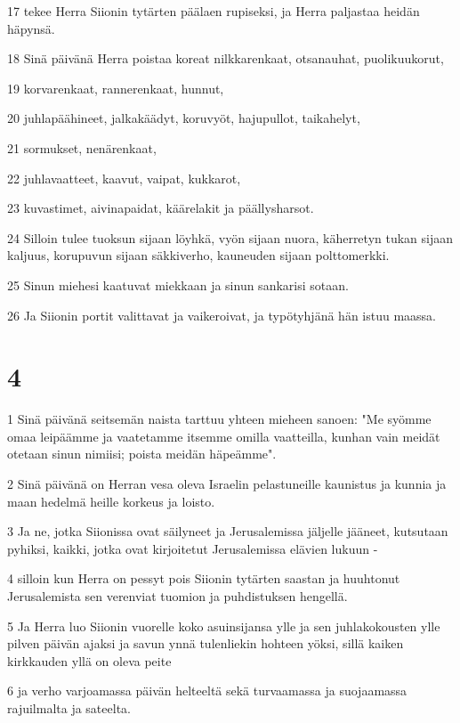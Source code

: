 \par 17 tekee Herra Siionin tytärten päälaen rupiseksi, ja Herra paljastaa heidän häpynsä.
\par 18 Sinä päivänä Herra poistaa koreat nilkkarenkaat, otsanauhat, puolikuukorut,
\par 19 korvarenkaat, rannerenkaat, hunnut,
\par 20 juhlapäähineet, jalkakäädyt, koruvyöt, hajupullot, taikahelyt,
\par 21 sormukset, nenärenkaat,
\par 22 juhlavaatteet, kaavut, vaipat, kukkarot,
\par 23 kuvastimet, aivinapaidat, käärelakit ja päällysharsot.
\par 24 Silloin tulee tuoksun sijaan löyhkä, vyön sijaan nuora, käherretyn tukan sijaan kaljuus, korupuvun sijaan säkkiverho, kauneuden sijaan polttomerkki.
\par 25 Sinun miehesi kaatuvat miekkaan ja sinun sankarisi sotaan.
\par 26 Ja Siionin portit valittavat ja vaikeroivat, ja typötyhjänä hän istuu maassa.

\chapter{4}

\par 1 Sinä päivänä seitsemän naista tarttuu yhteen mieheen sanoen: "Me syömme omaa leipäämme ja vaatetamme itsemme omilla vaatteilla, kunhan vain meidät otetaan sinun nimiisi; poista meidän häpeämme".
\par 2 Sinä päivänä on Herran vesa oleva Israelin pelastuneille kaunistus ja kunnia ja maan hedelmä heille korkeus ja loisto.
\par 3 Ja ne, jotka Siionissa ovat säilyneet ja Jerusalemissa jäljelle jääneet, kutsutaan pyhiksi, kaikki, jotka ovat kirjoitetut Jerusalemissa elävien lukuun -
\par 4 silloin kun Herra on pessyt pois Siionin tytärten saastan ja huuhtonut Jerusalemista sen verenviat tuomion ja puhdistuksen hengellä.
\par 5 Ja Herra luo Siionin vuorelle koko asuinsijansa ylle ja sen juhlakokousten ylle pilven päivän ajaksi ja savun ynnä tulenliekin hohteen yöksi, sillä kaiken kirkkauden yllä on oleva peite
\par 6 ja verho varjoamassa päivän helteeltä sekä turvaamassa ja suojaamassa rajuilmalta ja sateelta.

